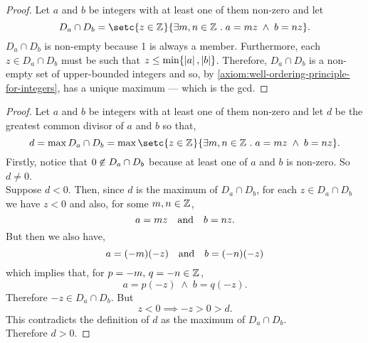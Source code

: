 \documentclass[../MathsNotesBase.tex]{subfiles}
\begin{document}
{		\biggerskip
		\begin{proof}
			Let $a$ and $b$ be integers with at least one of them non-zero and let
			\[ D_a \cap D_b = \setc{z \in \Z{}}{\exists m,n \in \Z{} \logicsep a = mz \; \land \; b = nz}. \]
			$D_a \cap D_b$ is non-empty because 1 is always a member. Furthermore, each ${ z \in D_a \cap D_b }$ must be such that ${ z \leq \min \{ \left\lvert a\right\rvert, \left\lvert b\right\rvert \} }$. Therefore, $D_a \cap D_b$ is a non-empty set of upper-bounded integers and so, by \autoref{axiom:well-ordering-principle-for-integers}, has a unique maximum --- which is the gcd.
		\end{proof}
	
		\bigskip
		\begin{proof}
			Let $a$ and $b$ be integers with at least one of them non-zero and let $d$ be the greatest common divisor of $a$ and $b$ so that,
			\[ d = \max D_a \cap D_b = \max \setc{z \in \Z{}}{\exists m,n \in \Z{} \logicsep a = mz \; \land \; b = nz}. \]
			Firstly, notice that ${ 0 \centernot\in D_a \cap D_b }$ because at least one of $a$ and $b$ is non-zero. So ${ d \neq 0 }$.\\
			
			Suppose ${ d < 0 }$. Then, since $d$ is the maximum of ${ D_a \cap D_b }$, for each ${ z \in D_a \cap D_b }$ we have ${ z < 0 }$ and also, for some ${ m,n \in \mathbb{Z}^{} }$,
			\[ a = mz \hspace{10pt}\text{and}\hspace{10pt} b = nz. \]
			But then we also have,
			\[  a = (-m)(-z) \hspace{10pt}\text{and}\hspace{10pt} b = (-n)(-z) \]
			which implies that, for ${ p = -m,\, q = -n \in \mathbb{Z}^{} }$,
			\[ a = p(-z) \; \land \; b = q(-z). \]
			Therefore ${ -z \in D_a \cap D_b }$. But 
			\[ z < 0 \implies -z > 0 > d. \]
			This contradicts the definition of $d$ as the maximum of ${ D_a \cap D_b }$.\\
			
			Therefore ${ d > 0 }$.
		\end{proof}
	
}
\end{document}
